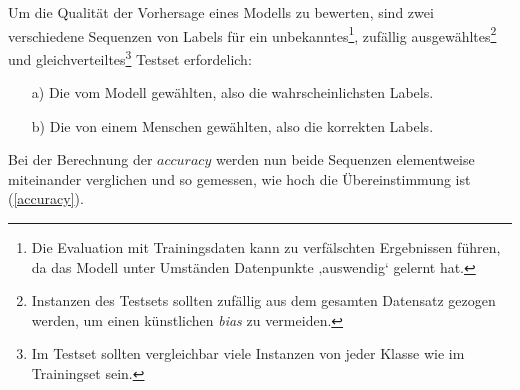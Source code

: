 Um die Qualität der Vorhersage eines Modells zu bewerten, sind zwei verschiedene Sequenzen von Labels für ein unbekanntes\footnote{Die Evaluation mit Trainingsdaten kann zu verfälschten Ergebnissen führen, da das Modell unter Umständen Datenpunkte ‚auswendig‘ gelernt hat.}, zufällig ausgewähltes\footnote{Instanzen des Testsets sollten zufällig aus dem gesamten Datensatz gezogen werden, um einen künstlichen \textit{bias} zu vermeiden.} und gleichverteiltes\footnote{Im Testset sollten vergleichbar viele Instanzen von jeder Klasse wie im Trainingset sein.} Testset erfordelich:

\begin{itemize}
\item[a)] Die vom Modell gewählten, also die \hspace{0.3mm}w\hspace{0.3mm}a\hspace{0.3mm}h\hspace{0.3mm}r\hspace{0.3mm}s\hspace{0.3mm}c\hspace{0.3mm}h\hspace{0.3mm}e\hspace{0.3mm}i\hspace{0.3mm}n\hspace{0.3mm}l\hspace{0.3mm}i\hspace{0.3mm}c\hspace{0.3mm}h\hspace{0.3mm}s\hspace{0.3mm}t\hspace{0.3mm}e\hspace{0.3mm}n\hspace{0.3mm} Labels.
\item[b)] Die von einem Menschen gewählten, also die \hspace{0.3mm}k\hspace{0.3mm}o\hspace{0.3mm}r\hspace{0.3mm}r\hspace{0.3mm}e\hspace{0.3mm}k\hspace{0.3mm}t\hspace{0.3mm}e\hspace{0.3mm}n\hspace{0.3mm} Labels.
\end{itemize}

Bei der Berechnung der $accuracy$ werden nun beide Sequenzen elementweise miteinander verglichen und so gemessen, wie hoch die Übereinstimmung ist (\ref{accuracy}).

